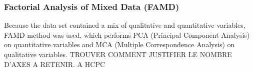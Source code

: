 \subsubsection{Factorial Analysis of Mixed Data (FAMD)}
Because the data set contained a mix of qualitative and quantitative variables, FAMD method was used, which performs PCA (Principal Component Analysis) on quantitative variables and MCA (Multiple Correspondence Analysis) on qualitative variables. TROUVER COMMENT JUSTIFIER LE NOMBRE D'AXES A RETENIR. A HCPC 